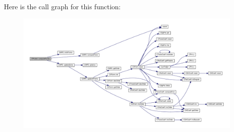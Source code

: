 Here is the call graph for this function\-:
\nopagebreak
\begin{figure}[H]
\begin{center}
\leavevmode
\includegraphics[width=350pt]{classCProtein_a7d6c3fb53c773ea006d123e35301d9b8_cgraph}
\end{center}
\end{figure}


